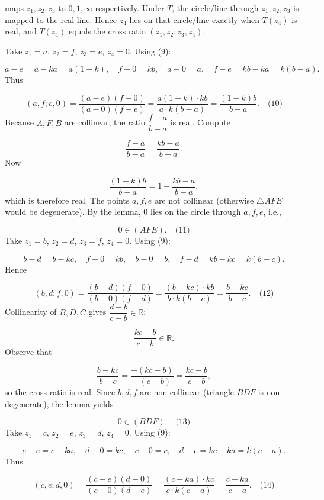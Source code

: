 maps \(z_1,z_2,z_3\) to \(0,1,\infty\) respectively. Under \(T\), the circle/line through \(z_1,z_2,z_3\) is mapped to the real line. Hence \(z_4\) lies on that circle/line exactly when \(T(z_4)\) is real, and \(T(z_4)\) equals the cross ratio \((z_1,z_2;z_3,z_4)\).\par
\smallskip
{}
Take \(z_1 = a\), \(z_2 = f\), \(z_3 = e\), \(z_4 = 0\). Using (9):\par
\[
a - e = a - k a = a(1 - k),\quad f - 0 = k b,\quad a - 0 = a,\quad f - e = k b - k a = k(b - a).
\]
Thus\par
\[
(a,f;e,0) = \frac{(a - e)(f - 0)}{(a - 0)(f - e)} = \frac{a(1 - k) \cdot k b}{a \cdot k(b - a)} = \frac{(1 - k)b}{b - a}. \quad\text{(10)}
\]
Because \(A,F,B\) are collinear, the ratio \(\dfrac{f - a}{b - a}\) is real. Compute\par
\[
\frac{f - a}{b - a} = \frac{k b - a}{b - a}.
\]
Now\par
\[
\frac{(1 - k)b}{b - a} = 1 - \frac{k b - a}{b - a},
\]
which is therefore real. The points \(a,f,e\) are not collinear (otherwise \(\triangle AFE\) would be degenerate). By the lemma, \(0\) lies on the circle through \(a,f,e\), i.e.,\par
\[
0 \in (AFE). \quad\text{(11)}
\]
\smallskip
{}
Take \(z_1 = b\), \(z_2 = d\), \(z_3 = f\), \(z_4 = 0\). Using (9):\par
\[
b - d = b - k c,\quad f - 0 = k b,\quad b - 0 = b,\quad f - d = k b - k c = k(b - c).
\]
Hence\par
\[
(b,d;f,0) = \frac{(b - d)(f - 0)}{(b - 0)(f - d)} = \frac{(b - k c) \cdot k b}{b \cdot k(b - c)} = \frac{b - k c}{b - c}. \quad\text{(12)}
\]
Collinearity of \(B,D,C\) gives \(\dfrac{d - b}{c - b} \in \mathbb{R}\):\par
\[
\frac{k c - b}{c - b} \in \mathbb{R}.
\]
Observe that\par
\[
\frac{b - k c}{b - c} = \frac{-(k c - b)}{-(c - b)} = \frac{k c - b}{c - b},
\]
so the cross ratio is real. Since \(b,d,f\) are non-collinear (triangle \(BDF\) is non-degenerate), the lemma yields\par
\[
0 \in (BDF). \quad\text{(13)}
\]
\smallskip
{}
Take \(z_1 = c\), \(z_2 = e\), \(z_3 = d\), \(z_4 = 0\). Using (9):\par
\[
c - e = c - k a,\quad d - 0 = k c,\quad c - 0 = c,\quad d - e = k c - k a = k(c - a).
\]
Thus\par
\[
(c,e;d,0) = \frac{(c - e)(d - 0)}{(c - 0)(d - e)} = \frac{(c - k a) \cdot k c}{c \cdot k(c - a)} = \frac{c - k a}{c - a}. \quad\text{(14)}
\]

